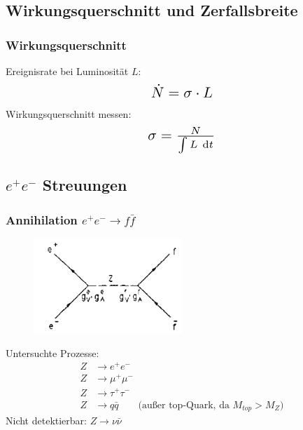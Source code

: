 \subsection{Wirkungsquerschnitt und Zerfallsbreite}
\begin{frame}
	\frametitle{Wirkungsquerschnitt}
	\hspace{1cm} Ereignisrate bei Luminosität $L$:
	\begin{equation*}
	\scalebox{1.5}{$\dot{N} = \sigma \cdot L$}
	\end{equation*}
	\hspace{1cm} Wirkungsquerschnitt messen:
	\begin{equation*}
	\scalebox{1.5}{$\sigma = \frac{N}{\int L~\text{d}t}$}
	\end{equation*}
\end{frame}
\subsection{$e^+e^-$ Streuungen}
\begin{frame}
	\frametitle{Annihilation $e^+e^- \rightarrow f\bar{f}$ }
	\begin{center}
		\begin{figure}
			\includegraphics[width=0.5\textwidth]{graphics/presentationannihilation.png}
		\end{figure}
	\end{center}
	Untersuchte Prozesse:\\
	\begin{equation*}
	\begin{aligned}
	Z &\rightarrow e^+e^-\\
	Z &\rightarrow \mu^+\mu^-\\
	Z &\rightarrow \tau^+\tau^-\\
	Z &\rightarrow q\bar{q} \qquad\text{(außer top-Quark, da $M_{top} > M_Z$)}
	\end{aligned}
	\end{equation*}
	Nicht detektierbar:
	$Z \rightarrow \nu \bar\nu$
\end{frame}	
